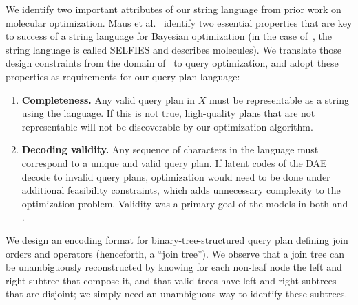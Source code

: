  We identify two important attributes of our string language from prior work on molecular optimization. Maus et al.~\cite{lolbo} identify two essential properties that are key to success of a string language for Bayesian optimization (in the case of~\cite{lolbo}, the string language is called SELFIES \cite{selfies} and describes molecules). We translate those design constraints from the domain of~\cite{lolbo} to query optimization, and adopt these properties as requirements for our query plan language:
\begin{enumerate}[leftmargin=*]
    \item \textbf{Completeness.} Any valid query plan in $X$ must be representable as a string using the language. If this is not true, high-quality plans that are not representable will not be discoverable by our optimization algorithm.
    \item \textbf{Decoding validity.} Any sequence of characters in the language must correspond to a unique and valid query plan. If latent codes of the DAE decode to invalid query plans, optimization would need to be done under additional feasibility constraints, which adds unnecessary complexity to the optimization problem. Validity was a primary goal of the models in both \citet{JTVAE} and \citet{maus2022local}.
\end{enumerate}


 We design an encoding format for binary-tree-structured query plan defining join orders and operators (henceforth, a ``join tree'').  We observe that a join tree can be unambiguously reconstructed by knowing for each non-leaf node the left and right subtree that compose it, and that valid trees have left and right subtrees that are disjoint; we simply need an unambiguous way to identify these subtrees.

